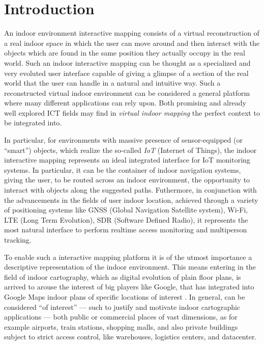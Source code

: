 \section{Introduction}\label{introduction}

An indoor environment interactive mapping consists of a virtual reconstruction
of a real indoor space in which the user can move around and then interact
with the objects which are found in the same position they actually occupy in the
real world. Such an indoor interactive mapping can be thought as a specialized
and very evoluted user interface capable of giving a glimpse of a section of
the real world that the user can handle in a natural and intuitive way.  Such
a reconstructed virtual indoor environment can be considered a general
platform where many different applications can rely upon. Both promising and
already well explored ICT fields may find in \emph{virtual indoor mapping} the
perfect context to be integrated into.

In particular, for environments with massive presence of sensor-equipped (or
``smart'') objects, which realize the so-called \emph{IoT} (Internet of
Things), the indoor interactive mapping represents an ideal integrated
interface for IoT monitoring systems. In particular, it can be the container
of indoor navigation systems, giving the user, to be routed across an indoor
environment, the opportunity to interact with objects along the suggested
paths. Futhermore, in conjunction with the advancements in the fields of user
indoor location, achieved through a variety of positioning systems like GNSS
(Global Navigation Satellite system), Wi-Fi, LTE (Long Term Evolution),
SDR (Software Defined Radio), it represents the most natural interface to
perform realtime access monitoring and multiperson tracking.

To enable such a interactive mapping platform it is of the utmost importance a
descriptive representation of the indoor environment. This means entering in
the field of indoor cartography, which as digital evolution of plain floor
plans, is arrived to arouse the interest of big players like Google, that has
integrated into Google Maps indoor plans of specific locations of interest
\cite{indoormaps}. In general, can be considered ``of interest'' --- such to
justify and motivate indoor cartographic applications --- both public or
commercial places of vast dimensions, as for example airports, train stations,
shopping malls, and also private buildings subject to strict access control,
like warehouses, logistics centers, and datacenter.

